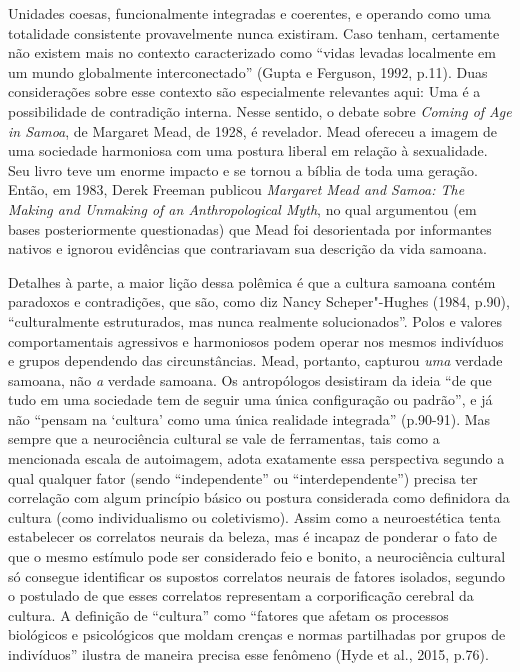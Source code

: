 Unidades coesas, funcionalmente integradas e coerentes, e operando como
uma totalidade consistente provavelmente nunca existiram. Caso tenham,
certamente não existem mais no contexto caracterizado como ``vidas
levadas localmente em um mundo globalmente interconectado'' (Gupta e
Ferguson, 1992, p.11). Duas considerações sobre esse contexto são
especialmente relevantes aqui: Uma é a possibilidade de contradição
interna. Nesse sentido, o debate sobre \emph{Coming of Age in Samoa}, de
Margaret Mead, de 1928, é revelador. Mead ofereceu a imagem de uma
sociedade harmoniosa com uma postura liberal em relação à sexualidade.
Seu livro teve um enorme impacto e se tornou a bíblia de toda uma
geração. Então, em 1983, Derek Freeman publicou \emph{Margaret Mead and
Samoa: The Making and Unmaking of an Anthropological Myth}, no qual
argumentou (em bases posteriormente questionadas) que Mead foi
desorientada por informantes nativos e ignorou evidências que
contrariavam sua descrição da vida samoana.

Detalhes à parte, a maior lição dessa polêmica é que a cultura samoana
contém paradoxos e contradições, que são, como diz Nancy Scheper"-Hughes
(1984, p.90), ``culturalmente estruturados, mas nunca realmente
solucionados''. Polos e valores comportamentais agressivos e harmoniosos
podem operar nos mesmos indivíduos e grupos dependendo das
circunstâncias. Mead, portanto, capturou \emph{uma} verdade samoana, não
\emph{a} verdade samoana. Os antropólogos desistiram da ideia ``de que
tudo em uma sociedade tem de seguir uma única configuração ou padrão'',
e já não ``pensam na `cultura' como uma única realidade integrada''
(p.90-91). Mas sempre que a neurociência cultural se vale de
ferramentas, tais como a mencionada escala de autoimagem, adota
exatamente essa perspectiva segundo a qual qualquer fator (sendo
``independente'' ou ``interdependente'') precisa ter correlação com
algum princípio básico ou postura considerada como definidora da cultura
(como individualismo ou coletivismo). Assim como a neuroestética tenta
estabelecer os correlatos neurais da beleza, mas é incapaz de ponderar o
fato de que o mesmo estímulo pode ser considerado feio e bonito, a
neurociência cultural só consegue identificar os supostos correlatos
neurais de fatores isolados, segundo o postulado de que esses correlatos
representam a corporificação cerebral da cultura. A definição de
``cultura'' como ``fatores que afetam os processos biológicos e
psicológicos que moldam crenças e normas partilhadas por grupos de
indivíduos'' ilustra de maneira precisa esse fenômeno (Hyde et al.,
2015, p.76).

